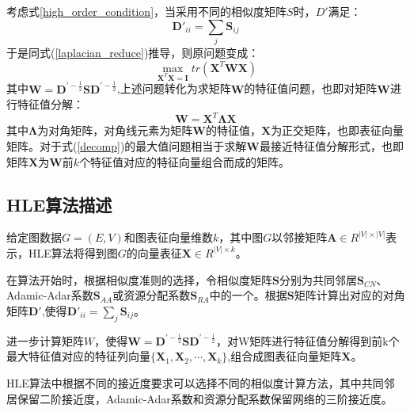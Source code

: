 考虑式\ref{high_order_condition}，当采用不同的相似度矩阵$S$时，$D'$满足：
\begin{equation}
\textbf{D}'_{ii} = \sum_j{\textbf{S}_{ij}}
\end{equation}
于是同式(\ref{laplacian_reduce})推导，则原问题变成：
\begin{equation}\label{decomp}
\max_{\textbf{X}^T\textbf{X} = \textbf{I}} tr(\textbf{X}^T\textbf{WX})
\end{equation}
其中$\textbf{W} = \textbf{D}^{\prime-\frac{1}{2}}\textbf{SD}^{\prime-\frac{1}{2}}$,上述问题转化为求矩阵$\textbf{W}$的特征值问题，也即对矩阵$\textbf{W}$进行特征值分解：
\begin{equation}\label{evol}
	\textbf{W} = \textbf{X}^T \bm{\Lambda} \textbf{X} 
\end{equation}
其中$\bm{\Lambda}$为对角矩阵，对角线元素为矩阵$\textbf{W}$的特征值，$\textbf{X}$为正交矩阵，也即表征向量矩阵。对于式(\ref{decomp})的最大值问题相当于求解$\textbf{W}$最接近特征值分解形式，也即矩阵$\textbf{X}$为$\textbf{W}$前$k$个特征值对应的特征向量组合而成的矩阵。

\subsection{HLE算法描述}
	给定图数据$G = (E,V)$和图表征向量维数$k$，其中图$G$以邻接矩阵$\textbf{A}\in R^{|V|\times |V|}$表示，HLE算法将得到图$G$的向量表征$\textbf{X}\in R^{|V|\times k} $。
	
	在算法开始时，根据相似度准则的选择，令相似度矩阵$\textbf{S}$分别为共同邻居$\textbf{S}_{CN}$、Adamic-Adar系数$\textbf{S}_{AA}$或资源分配系数$\textbf{S}_{RA}$中的一个。根据$\textbf{S}$矩阵计算出对应的对角矩阵$\textbf{D}\prime$,使得$\textbf{D}'_{ii} = \sum_j \textbf{S}_{ij}$。

	进一步计算矩阵$W$，使得$\textbf{W}=\textbf{D}^{\prime-\frac{1}{2}}\textbf{SD}^{\prime-\frac{1}{2}}$，对W矩阵进行特征值分解得到前k个最大特征值对应的特征列向量$\{\textbf{X}_1,\textbf{X}_2,\cdots,\textbf{X}_k\}$,组合成图表征向量矩阵$\textbf{X}$。
	
	HLE算法中根据不同的接近度要求可以选择不同的相似度计算方法，其中共同邻居保留二阶接近度，Adamic-Adar系数和资源分配系数保留网络的三阶接近度。


